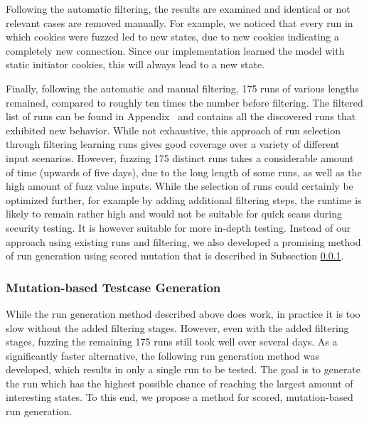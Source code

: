 Following the automatic filtering, the results are examined and identical or not relevant cases are removed manually. For example, we noticed that every run in which cookies were fuzzed led to new states, due to new cookies indicating a completely new connection. Since our implementation learned the model with static initiator cookies, this will always lead to a new state. 

Finally, following the automatic and manual filtering, 175 runs of various lengths remained, compared to roughly ten times the number before filtering. The filtered list of runs can be found in Appendix~ and contains all the discovered runs that exhibited new behavior. While not exhaustive, this approach of run selection through filtering learning runs gives good coverage over a variety of different input scenarios. However, fuzzing 175 distinct runs takes a considerable amount of time (upwards of five days), due to the long length of some runs, as well as the high amount of fuzz value inputs. While the selection of runs could certainly be optimized further, for example by adding additional filtering steps, the runtime is likely to remain rather high and would not be suitable for quick scans during security testing. It is however suitable for more in-depth testing. Instead of our approach using existing runs and filtering, we also developed a promising method of run generation using scored mutation that is described in Subsection \ref{subsubsec:mutations}.


\subsubsection{Mutation-based Testcase Generation} \label{subsubsec:mutations}
While the run generation method described above does work, in practice it is too slow without the added filtering stages. However, even with the added filtering stages, fuzzing the remaining 175 runs still took well over several days. As a significantly faster alternative, the following run generation method was developed, which results in only a single run to be tested. The goal is to generate the run which has the highest possible chance of reaching the largest amount of interesting states. To this end, we propose a method for scored, mutation-based run generation. 

